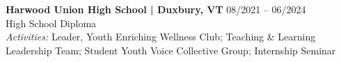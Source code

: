 \noindent
\textbf{Harwood Union High School | Duxbury, VT} \hfill 08/2021 -- 06/2024 \\
High School Diploma \\
\textit{Activities:} Leader, Youth Enriching Wellness Club; Teaching \& Learning Leadership Team; Student Youth Voice Collective Group; Internship Seminar
